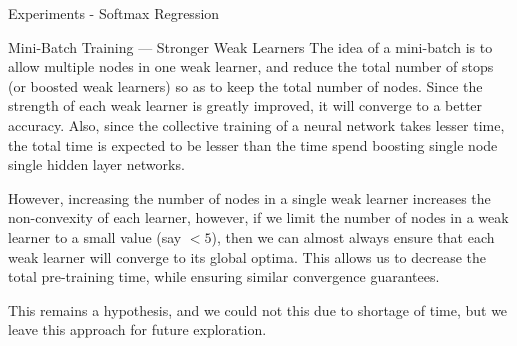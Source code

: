 \documentclass{article}
\begin{document}
\begin{psection}{Experiments - Softmax Regression}
\begin{psubsection}{Mini-Batch Training --- Stronger Weak Learners}
		The idea of a mini-batch is to allow multiple nodes in one weak learner, and reduce the total number of stops (or boosted weak learners) so as to keep the total number of nodes. Since the strength of each weak learner is greatly improved, it will converge to a better accuracy. Also, since the collective training of a neural network takes lesser time, the total time is expected to be lesser than the time spend boosting single node single hidden layer networks.

		However, increasing the number of nodes in a single weak learner increases the non-convexity of each learner, however, if we limit the number of nodes in a weak learner to a small value (say $< 5$), then we can almost always ensure that each weak learner will converge to its global optima. This allows us to decrease the total pre-training time, while ensuring similar convergence guarantees.

		This remains a hypothesis, and we could not this due to shortage of time, but we leave this approach for future exploration.

	\end{psubsection}

\end{psection}
\end{document}
